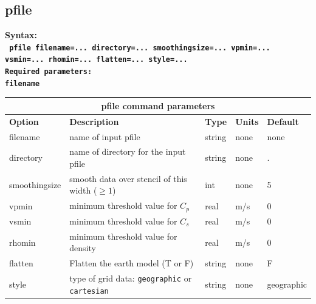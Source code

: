 \documentclass[11pt]{report}
\begin{document}
{\subsection{pfile}
\label{keyword:pfile}
\begin{flushleft}\bf
	Syntax:\\
	\tt
	pfile filename=... directory=... smoothingsize=... vpmin=... vsmin=... rhomin=... flatten=... style=... \\
	\bf Required parameters:\\
	\tt filename
\end{flushleft}
%
\begin{center}
	\begin{tabular}{|l|p{8cm}|l|l||l|} \hline
		\multicolumn{5}{|c|}{\bf pfile command parameters}                                                                \\ \hline
		{\bf Option}  & {\bf Description}                                      & {\bf Type} & {\bf Units} & {\bf Default} \\ \hline
		\hline
		filename      & name of input pfile                                    & string     & none        & none          \\ \hline
		directory     & name of directory for the input pfile                  & string     & none        & .             \\ \hline
		smoothingsize & smooth data over stencil of this width ($\geq 1$)      & int        & none        & 5             \\ \hline
		vpmin         & minimum threshold value for $C_p$                      & real       & m/s         & 0             \\ \hline
		vsmin         & minimum threshold value for $C_s$                      & real       & m/s         & 0             \\ \hline
		rhomin        & minimum threshold value for density                    & real       & m/s         & 0             \\ \hline
		flatten       & Flatten the earth model (T or F)                       & string     & none        & F             \\ \hline
		style         & type of grid data: {\tt geographic} or {\tt cartesian} & string     & none        & geographic    \\ \hline
	\end{tabular}
\end{center}

}
\end{document}
